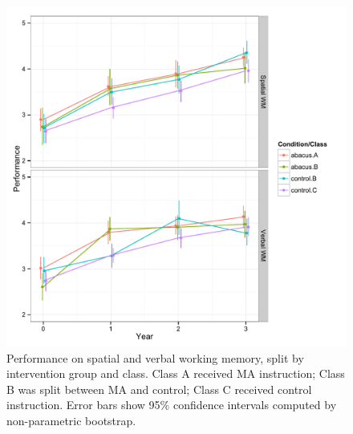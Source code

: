 \documentclass[11pt]{article}
\begin{document}
\begin{figure}[H]
\begin{center}
\includegraphics[width=5.5in]{figures/cog1_class.pdf}
\end{center}
\caption{Performance on spatial and verbal working memory, split by intervention group and class. Class A received MA instruction; Class B was split between MA and control; Class C received control instruction. Error bars show 95\% confidence intervals computed by non-parametric bootstrap.}
\label{fig:cogclass1}
\end{figure}
\end{document}
